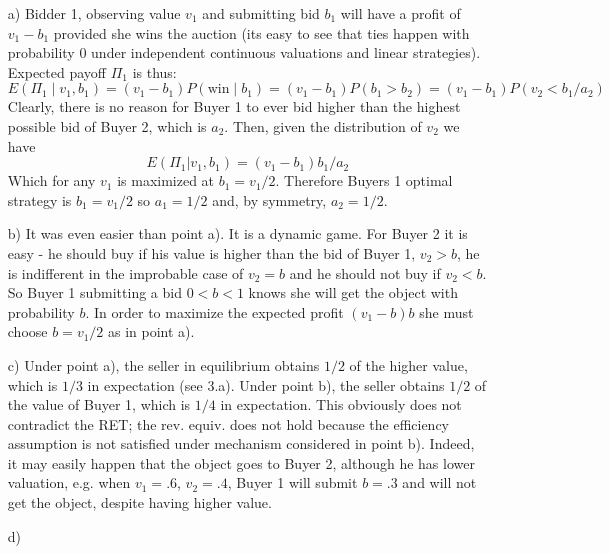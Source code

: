 \documentclass{../ape}
\begin{document}
\begin{solution}
\begin{enumerate}
\item[a)]
Bidder 1, observing value $v_1$ and submitting bid $b_1$ will have a profit of $v_1 - b_1$ provided she wins the auction (its easy to see that ties happen with probability 0 under independent continuous valuations and linear strategies). Expected payoff $\Pi_1$ is thus:
\[
E(\Pi_1 \mid v_1, b_1) = (v_1-b_1)P(\text{win}\mid b_1) = (v_1-b_1)P(b_1 > b_2) = (v_1-b_1)P(v_2 < b_1 / a_2)
\]
Clearly, there is no reason for Buyer 1 to ever bid higher than the highest possible bid of Buyer 2, which is $a_2$. Then, given the distribution of $v_2$ we have
\[
E(\Pi_1|v_1, b_1) = (v_1 - b_1) b_1 / a_2
\]
Which for any $v_1$ is maximized at $b_1 = v_1/2$. Therefore Buyers 1 optimal strategy is $b_1 = v_1/2$ so $a_1 = 1/2$ and, by symmetry, $a_2 = 1/2$.

\item[b)]
It was even easier than point a). It is a dynamic game. For Buyer 2 it is easy - he should buy if his value is higher than the bid of Buyer 1, $v_2 > b$, he is indifferent in the improbable case of $v_2 = b$ and he should not buy if $v_2 < b$. So Buyer 1 submitting a bid $0 < b < 1$ knows she will get the
object with probability $b$. In order to maximize the expected profit $(v_1 - b)b$ she must choose $b = v_1 /2$ as in point a).

\item[c)]
Under point a), the seller in equilibrium obtains $1/2$ of the higher value, which is $1/3$ in expectation (see 3.a). Under point b), the seller obtains $1/2$ of
the value of Buyer 1, which is $1/4$ in expectation. This obviously does not contradict the RET; the rev. equiv. does not hold because the efficiency assumption is not satisfied under mechanism considered in point b). Indeed, it may easily happen that the object goes to Buyer 2, although he has lower valuation, e.g. when $v_1 = .6$, $v_2 = .4$, Buyer 1 will submit $b = .3$ and will not get the object, despite having higher value.


\item[d)]


\end{enumerate}
\end{solution}
\end{document}
